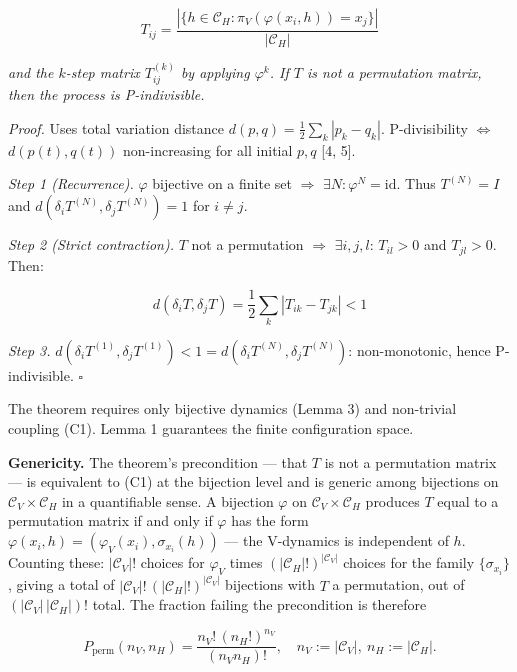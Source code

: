 \documentclass[
]{article}
\begin{document}
\[T_{ij} = \frac{|\{h \in \mathcal{C}_H : \pi_V(\varphi(x_i, h)) = x_j\}|}{|\mathcal{C}_H|}\]

\emph{and the \(k\)-step matrix \(T^{(k)}_{ij}\) by applying
\(\varphi^k\). If \(T\) is not a permutation matrix, then the process is
P-indivisible.}

\emph{Proof.} Uses total variation distance
\(d(p, q) = \frac{1}{2}\sum_k |p_k - q_k|\). P-divisibility \(\iff\)
\(d(p(t), q(t))\) non-increasing for all initial \(p, q\) {[}4, 5{]}.

\emph{Step 1 (Recurrence).} \(\varphi\) bijective on a finite set
\(\Rightarrow\) \(\exists N: \varphi^N = \text{id}\). Thus
\(T^{(N)} = I\) and \(d(\delta_i T^{(N)}, \delta_j T^{(N)}) = 1\) for
\(i \neq j\).

\emph{Step 2 (Strict contraction).} \(T\) not a permutation
\(\Rightarrow\) \(\exists i, j, l\): \(T_{il} > 0\) and \(T_{jl} > 0\).
Then:

\[d(\delta_i T, \delta_j T) = \frac{1}{2}\sum_k |T_{ik} - T_{jk}| < 1\]

\emph{Step 3.}
\(d(\delta_i T^{(1)}, \delta_j T^{(1)}) < 1 = d(\delta_i T^{(N)}, \delta_j T^{(N)})\):
non-monotonic, hence P-indivisible. \(\square\)

The theorem requires only bijective dynamics (Lemma 3) and non-trivial
coupling (C1). Lemma 1 guarantees the finite configuration space.

\textbf{Genericity.} The theorem's precondition --- that \(T\) is not a
permutation matrix --- is equivalent to (C1) at the bijection level and
is generic among bijections on \(\mathcal{C}_V \times \mathcal{C}_H\) in
a quantifiable sense. A bijection \(\varphi\) on
\(\mathcal{C}_V \times \mathcal{C}_H\) produces \(T\) equal to a
permutation matrix if and only if \(\varphi\) has the form
\(\varphi(x_i, h) = (\varphi_V(x_i), \sigma_{x_i}(h))\) --- the
V-dynamics is independent of \(h\). Counting these: \(|\mathcal{C}_V|!\)
choices for \(\varphi_V\) times \((|\mathcal{C}_H|!)^{|\mathcal{C}_V|}\)
choices for the family \(\{\sigma_{x_i}\}\), giving a total of
\(|\mathcal{C}_V|!\,(|\mathcal{C}_H|!)^{|\mathcal{C}_V|}\) bijections
with \(T\) a permutation, out of \((|\mathcal{C}_V|\,|\mathcal{C}_H|)!\)
total. The fraction failing the precondition is therefore

\[P_{\text{perm}}(n_V, n_H) = \frac{n_V!\,(n_H!)^{n_V}}{(n_V n_H)!}, \quad n_V := |\mathcal{C}_V|,\ n_H := |\mathcal{C}_H|.\]
\end{document}
